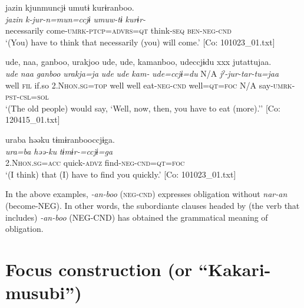  \ex\relax[= (10-33)]

    
      \glll    jazin  kjunmuncjɨ  umutɨ  kurɨranboo.\\
      \textit{jazin}  \textit{k-jur-n=mun=ccjɨ}  \textit{umuw-tɨ}  \textit{kurɨr-}\\
      necessarily  come-\textsc{umrk}-\textsc{ptcp}=\textsc{advrs}=\textsc{qt}  think-\textsc{seq}  \textsc{ben}-\textsc{neg}-\textsc{cnd}\\
      \glt       ‘(You) have to think that necessarily (you) will come.’ [Co: 101023\_01.txt]

  \ex\relax[= (4-57)]

    
      \glll    ude,  naa,  ganboo,  urakjoo  ude,  ude,  kamanboo, udeccjɨdu  xxx  jutattujaa.\\
      \textit{ude}  \textit{naa}  \textit{ganboo}  \textit{urakja=ja}  \textit{ude}  \textit{ude}  \textit{kam-} \textit{ude=ccjɨ=du}  N/A  \textit{jˀ-jur-tar-tu=jaa}\\
      well  \textsc{fil}  if.so  2.N\textsc{hon}.\textsc{sg}=\textsc{top}  well  well  eat-\textsc{neg}-\textsc{cnd}  well=\textsc{qt}=\textsc{foc}  N/A  say-\textsc{umrk}-\textsc{pst}-\textsc{csl}=\textsc{sol}\\
    \glt       ‘(The old people) would say, ‘Well, now, then, you have to eat (more).’’ [Co: 120415\_01.txt]

  \ex  
      \glll    uraba  həəku  tɨmɨranbooccjɨga.\\
      \textit{ura=ba}  \textit{həə-ku}  \textit{tɨmɨr-=ccjɨ=ga}\\
      2.N\textsc{hon}.\textsc{sg}=\textsc{acc}  quick-\textsc{advz}  find-\textsc{neg}-\textsc{cnd}=\textsc{qt}=\textsc{foc}\\
      \glt       ‘(I think) that (I) have to find you quickly.’ [Co: 101023\_01.txt]
\z
\z

In the above examples, \textit{{}-an-boo} (\textsc{neg}-\textsc{cnd}) expresses obligation without \textit{nar-an} (become-NEG). In other words, the subordiante clauses headed by (the verb that includes) \textit{{}-an-boo} (NEG-CND) has obtained the grammatical meaning of obligation.

\section{Focus construction (or “Kakari-musubi”)}\label{sec:11.3}

